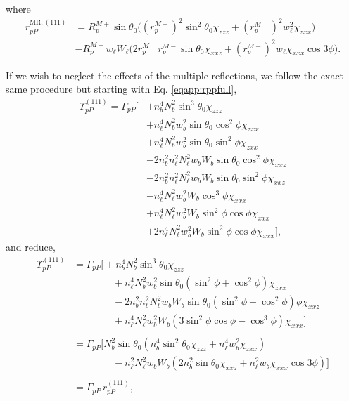 where
\begin{equation}\label{eqapp:final-rpp.mr.111}
\begin{split}
r^{\mathrm{MR},(111)}_{pP} &= 
R^{M+}_{p}\sin\theta_{0}
\Big(
  \left(r^{M+}_{p}\right)^{2}\sin^{2}\theta_{0}\chi_{zzz}
+ \left(r^{M-}_{p}\right)^{2}w^{2}_{\ell}\chi_{zxx}
\Big)\\
&- R^{M-}_{p}w_{\ell}W_{\ell}
\Big(
  2r^{M+}_{p}r^{M-}_{p}\sin\theta_{0}\chi_{xxz}
+ \left(r^{M-}_{p}\right)^{2}w_{\ell}\chi_{xxx}\cos3\phi
\Big).
\end{split}
\end{equation}

If we wish to neglect the effects of the multiple reflections, we follow the
exact same procedure but starting with Eq. \eqref{eqapp:rppfull},
\begin{equation*}
\begin{split}
\Upsilon^{(111)}_{pP}
= \Gamma_{pP}
\big[
&+ n^{4}_{b}N^{2}_{b}\sin^{3}\theta_{0}\chi_{zzz}\\
&+ n^{4}_{\ell}N^{2}_{b}w^{2}_{b}\sin\theta_{0}\cos^{2}\phi\chi_{zxx}\\
&+ n^{4}_{\ell}N^{2}_{b}w^{2}_{b}\sin\theta_{0}\sin^{2}\phi\chi_{zxx}\\
&- 2n^{2}_{b}n^{2}_{\ell}N^{2}_{\ell}w_{b}W_{b}\sin\theta_{0}\cos^{2}\phi
  \chi_{xxz}\\
&- 2n^{2}_{b}n^{2}_{\ell}N^{2}_{\ell}w_{b}W_{b}\sin\theta_{0}\sin^{2}\phi
  \chi_{xxz}\\
&- n^{4}_{\ell}N^{2}_{\ell}w^{2}_{b}W_{b}\cos^{3}\phi\chi_{xxx}\\
&+ n^{4}_{\ell}N^{2}_{\ell}w^{2}_{b}W_{b}\sin^{2}\phi\cos\phi\chi_{xxx}\\
&+ 2n^{4}_{\ell}N^{2}_{\ell}w^{2}_{b}W_{b}\sin^{2}\phi\cos\phi\chi_{xxx}
\big],
\end{split}
\end{equation*}
and reduce,
\begin{equation*}
\begin{split}
\Upsilon^{(111)}_{pP} &=
\Gamma_{pP}
\big[
+ n^{4}_{b}N^{2}_{b}
   \sin^{3}\theta_{0}\chi_{zzz}\\
&\qquad\qquad+ n^{4}_{\ell}N^{2}_{b}w^{2}_{b}
   \sin\theta_{0}(\sin^{2}\phi + \cos^{2}\phi)\chi_{zxx}\\
&\qquad\qquad- 2n^{2}_{b}n^{2}_{\ell}N^{2}_{\ell}w_{b}W_{b}
   \sin\theta_{0}(\sin^{2}\phi + \cos^{2}\phi)\phi\chi_{xxz}\\
&\qquad\qquad+ n^{4}_{\ell}N^{2}_{\ell}w^{2}_{b}W_{b}
   (3\sin^{2}\phi\cos\phi - \cos^{3}\phi)\chi_{xxx}
\big]\\\\
&=
\Gamma_{pP}
\big[
N^{2}_{b}\sin\theta_{0}(n^{4}_{b}\sin^{2}\theta_{0}\chi_{zzz} 
+ n^{4}_{\ell}w^{2}_{b}\chi_{zxx})\\
&\qquad\qquad- n^{2}_{\ell}N^{2}_{\ell}w_{b}W_{b}(2n^{2}_{b}\sin\theta_{0}
\chi_{xxz} 
 + n^{2}_{\ell}w_{b}\chi_{xxx}\cos3\phi)
\big]\\\\
&= \Gamma_{pP}\,r^{(111)}_{pP},
\end{split}
\end{equation*}
